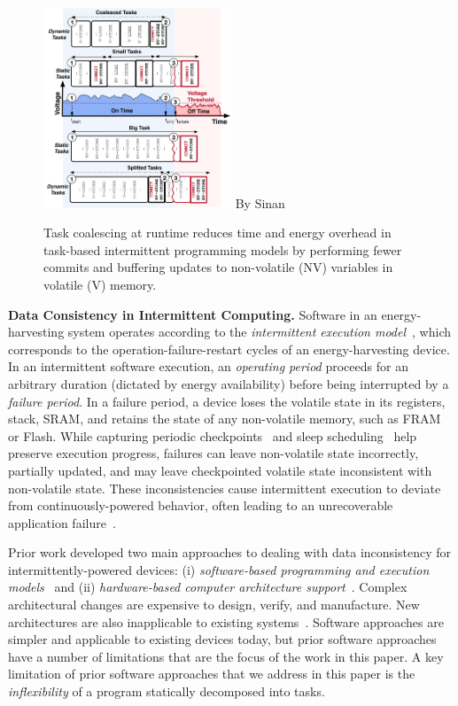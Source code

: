 \begin{figure}
    \centering
    \includegraphics[width=0.5\textwidth]{figures/graffle/intro-figure.pdf} By Sinan
    \caption{Task coalescing at runtime reduces time and energy overhead in task-based intermittent programming models by performing fewer commits and buffering updates to non-volatile (NV) variables in volatile (V) memory.}
    \label{fig:coalesce}
\end{figure}

\textbf{Data Consistency in Intermittent Computing.}  Software in an
energy-harvesting system operates according to the {\em intermittent execution
model}~\citep{dino,lucia_snapl_2017}, which corresponds to the
operation-failure-restart cycles of an energy-harvesting device. In an
intermittent software execution, an {\em operating period} proceeds for an
arbitrary duration (dictated by energy availability) before being interrupted
by a {\em failure period}. In a failure period, a device loses the volatile
state in its registers, stack, SRAM, and retains the state of any non-volatile
memory, such as FRAM or Flash. While capturing periodic
checkpoints~\citep{mementos,quickrecall} and sleep
scheduling~\citep{dewdrop,hibernus,hibernusplusplus} help preserve execution
progress, failures can leave non-volatile state incorrectly, partially updated,
and may leave checkpointed volatile state inconsistent with non-volatile state.
These inconsistencies cause intermittent execution to deviate from
continuously-powered behavior, often leading to an unrecoverable
application failure~\citep{dino,edb}. 

Prior work developed two main approaches to dealing with data inconsistency for
intermittently-powered devices: (i) \emph{software-based programming and
execution models}~\citep{dino,ratchet,chain,alpaca} and (ii)
\emph{hardware-based computer architecture
support}~\citep{hicks_isca_2017,idetic,nvp}.  Complex architectural changes are
expensive to design, verify, and manufacture.  New architectures are also
inapplicable to existing systems~\citep{hicks_isca_2017,nvp}. Software
approaches are simpler and applicable to existing devices today, but prior
software approaches have a number of limitations that are the focus of the work
in this paper.  A key limitation of prior software approaches that we address in this paper is the {\em inflexibility} of a program statically decomposed into tasks. 

